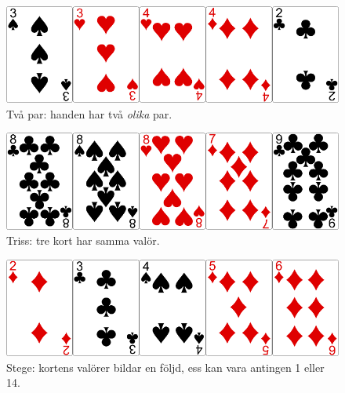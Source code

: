 \begin{figure}[H]
 \begin{minipage}[c]{\CardWidth}
  \includegraphics[width=\textwidth]{../img/w05-hands/twopair.png}
 \end{minipage}
 \begin{minipage}[c]{\CardCaptionWidth}
  \caption{Två par: handen har två \emph{olika} par.}
 \end{minipage}
\end{figure}

\begin{figure}[H]
 \begin{minipage}[c]{\CardWidth}
  \includegraphics[width=\textwidth]{../img/w05-hands/trips.png}
 \end{minipage}
 \begin{minipage}[c]{\CardCaptionWidth}
  \caption{Triss: tre kort har samma valör.}
 \end{minipage}
\end{figure}

\begin{figure}[H]
 \begin{minipage}[c]{\CardWidth}
  \includegraphics[width=\textwidth]{../img/w05-hands/straight.png}
 \end{minipage}
 \begin{minipage}[c]{\CardCaptionWidth}
  \caption{Stege: kortens valörer bildar en följd, ess kan vara antingen 1 eller 14.}
 \end{minipage}
\end{figure}

